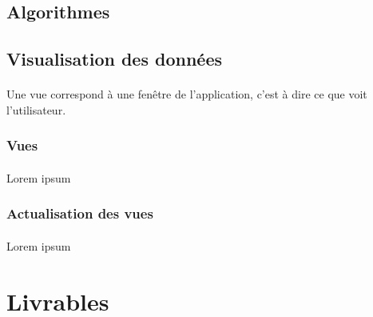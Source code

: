 \documentclass[12pt]{article}
\begin{document}
\subsection{Algorithmes}


\subsection{Visualisation des données}
\paragraph{} Une vue correspond à une fenêtre de l'application, c'est à dire ce que voit l'utilisateur.

\subsubsection{Vues}
\paragraph{} Lorem ipsum

\subsubsection{Actualisation des vues}
\paragraph{} Lorem ipsum

\newpage

\section{Livrables}


\end{document}
